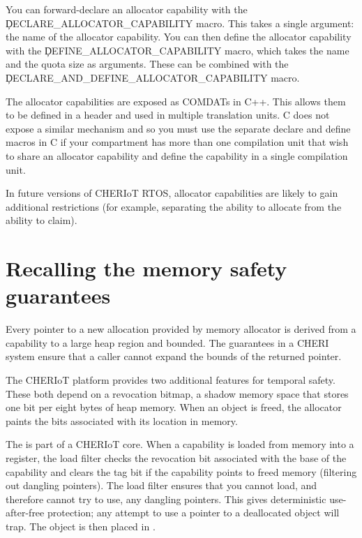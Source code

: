 You can forward-declare an allocator capability with the \c{DECLARE_ALLOCATOR_CAPABILITY} macro.
This takes a single argument: the name of the allocator capability.
You can then define the allocator capability with the \c{DEFINE_ALLOCATOR_CAPABILITY} macro, which takes the name and the quota size as arguments.
These can be combined with the \c{DECLARE_AND_DEFINE_ALLOCATOR_CAPABILITY} macro.

\begin{caution}
The allocator capabilities are exposed as COMDATs in C++.
This allows them to be defined in a header and used in multiple translation units.
C does not expose a similar mechanism and so you must use the separate declare and define macros in C if your compartment has more than one compilation unit that wish to share an allocator capability and define the capability in a single compilation unit.
\end{caution}

In future versions of CHERIoT RTOS, allocator capabilities are likely to gain additional restrictions (for example, separating the ability to allocate from the ability to claim).

\section{Recalling the memory safety guarantees}

Every pointer to a new allocation provided by memory allocator is derived from a capability to a large heap region and bounded.
The  guarantees in a CHERI system ensure that a caller cannot expand the bounds of the returned pointer.

The CHERIoT platform provides two additional features for temporal safety.
These both depend on a revocation bitmap, a shadow memory space that stores one bit per eight bytes of heap memory.
When an object is freed, the allocator paints the bits associated with its location in memory.

The  is part of a CHERIoT core.
When a capability is loaded from memory into a register, the load filter checks the revocation bit associated with the base of the capability and clears the tag bit if the capability points to freed memory (filtering out dangling pointers).
The load filter ensures that you cannot load, and therefore cannot try to use, any dangling pointers.
This gives deterministic use-after-free protection; any attempt to use a pointer to a deallocated object will trap.
The object is then placed in .

